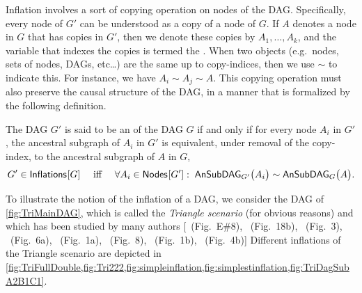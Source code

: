 Inflation involves a sort of copying operation on nodes of the DAG.  Specifically, every node of $G'$ can be understood as a copy of a node of $G$.    If $A$ denotes a node in $G$ that has copies in $G'$, then we denote these copies by $A_1,\ldots, A_k$, and the variable that indexes the copies is termed the .  When two objects (e.g.~nodes, sets of nodes, DAGs, etc\ldots) are the same up to copy-indices, then we use $\sim$ to indicate this.  For instance, we have $A_i\sim A_j\sim A$.   This copying operation must also preserve the causal structure of the DAG, in a manner that is formalized by the following definition. 
\begin{definition}
The DAG $G'$ is said to be an  of the DAG $G$ if and only if  for every node $A_i$ in $G'$, the ancestral subgraph of $A_i$ in $G'$ is equivalent, under removal of the copy-index, to the ancestral subgraph of $A$ in $G$,
\begin{align}\label{eq:definflationDAG}
G' \in\SmallNamedFunction{Inflations}{G} \quad\text{ iff }\quad \forall A_i\in \SmallNamedFunction{Nodes}{G'}:\; \ansubgraph[G']{A_i}\sim\ansubgraph[G]{A}.
\end{align}
\end{definition}

To illustrate the notion of the inflation of a DAG, we consider the DAG of \cref{fig:TriMainDAG}, which is called the {\em Triangle scenario} (for obvious reasons) and which has been studied by many authors [\citealp{pusey2014gdag}~(Fig.~E\#8), \citealp{WoodSpekkens}~(Fig.~18b), \citealp{fritz2012bell}~(Fig.~3), \citealp{chaves2014novel}~(Fig.~6a), \citealp{Chaves2015infoquantum}~(Fig.~1a), \citealp{BilocalCorrelations}~(Fig.~8), \citealp{steudel2010ancestors}~(Fig.~1b), \citealp{chaves2014informationinference}~(Fig.~4b)]
Different inflations of the Triangle scenario are depicted in \cref{fig:TriFullDouble,fig:Tri222,fig:simpleinflation,fig:simplestinflation,fig:TriDagSubA2B1C1}.

